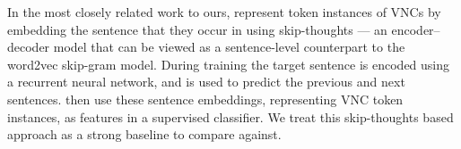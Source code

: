 \documentclass[11pt,a4paper]{article}
\begin{document}

In the most closely related work to ours,
 represent token instances of VNCs by
embedding the sentence that they occur in using skip-thoughts
\citep{Kiros+:2015} --- an encoder--decoder model that can be viewed
as a sentence-level counterpart to the word2vec \citep{mikolov+:2013b}
skip-gram model. During training the target sentence is encoded using
a recurrent neural network, and is used to predict the previous and
next sentences. \citeauthor{salton-ross-kelleher} then use these
sentence embeddings, representing VNC token instances, as features in
a supervised classifier.  We treat this skip-thoughts based approach
as a strong baseline to compare against.






\end{document}
